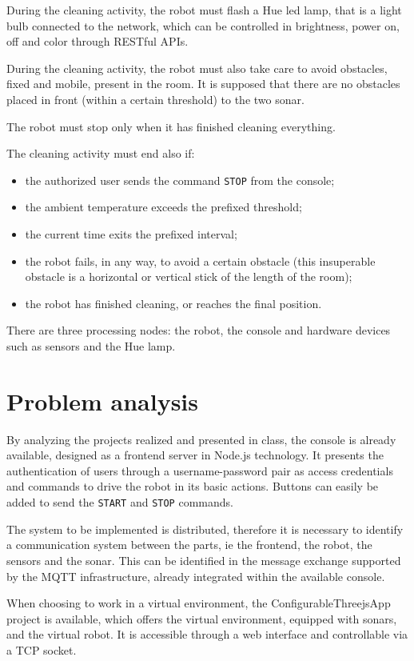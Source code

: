 During the cleaning activity, the robot must flash a Hue led lamp, that is a light bulb connected to the network, which can be controlled in brightness, power on, off and color through RESTful APIs.

During the cleaning activity, the robot must also take care to avoid obstacles, fixed and mobile, present in the room. It is supposed that there are no obstacles placed in front (within a certain threshold) to the two sonar.

The robot must stop only when it has finished cleaning everything.

The cleaning activity must end also if:
\begin{itemize}
\item the authorized user sends the command \texttt{STOP} from the console;
\item the ambient temperature exceeds the prefixed threshold;
\item the current time exits the prefixed interval;
\item the robot fails, in any way, to avoid a certain obstacle (this insuperable obstacle is a horizontal or vertical stick of the length of the room);
\item the robot has finished cleaning, or reaches the final position.
\end{itemize}

There are three processing nodes: the robot, the console and hardware devices such as sensors and the Hue lamp.

\section{Problem analysis}
By analyzing the projects realized and presented in class, the console is already available, designed as a frontend server in Node.js technology. It presents the authentication of users through a username-password pair as access credentials and commands to drive the robot in its basic actions. Buttons can easily be added to send the \texttt{START} and \texttt{STOP} commands.

The system to be implemented is distributed, therefore it is necessary to identify a communication system between the parts, ie the frontend, the robot, the sensors and the sonar. This can be identified in the message exchange supported by the MQTT infrastructure, already integrated within the available console.

When choosing to work in a virtual environment, the ConfigurableThreejsApp project is available, which offers the virtual environment, equipped with sonars, and the virtual robot. It is accessible through a web interface and controllable via a TCP socket.

